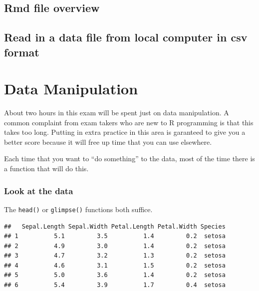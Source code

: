 \documentclass[]{book}
\newenvironment{Shaded}{\begin{snugshade}}{\end{snugshade}}
\newcommand{\KeywordTok}[1]{\textcolor[rgb]{0.13,0.29,0.53}{\textbf{#1}}}
\newcommand{\NormalTok}[1]{#1}
\newcommand{\OperatorTok}[1]{\textcolor[rgb]{0.81,0.36,0.00}{\textbf{#1}}}
\newcommand{\StringTok}[1]{\textcolor[rgb]{0.31,0.60,0.02}{#1}}
\begin{document}
\hypertarget{rmd-file-overview}{%
\section{Rmd file overview}\label{rmd-file-overview}}

\hypertarget{read-in-a-data-file-from-local-computer-in-csv-format}{%
\section{Read in a data file from local computer in csv format}\label{read-in-a-data-file-from-local-computer-in-csv-format}}

\hypertarget{data-manipulation}{%
\chapter{Data Manipulation}\label{data-manipulation}}

About two hours in this exam will be spent just on data manipulation. A common complaint from exam takers who are new to R programming is that this takes too long. Putting in extra practice in this area is garanteed to give you a better score because it will free up time that you can use elsewhere.

Each time that you want to ``do something'' to the data, most of the time there is a function that will do this.

\hypertarget{look-at-the-data}{%
\subsection{Look at the data}\label{look-at-the-data}}

The \texttt{head()} or \texttt{glimpse()} functions both suffice.

\begin{Shaded}
\end{Shaded}

\begin{verbatim}
##   Sepal.Length Sepal.Width Petal.Length Petal.Width Species
## 1          5.1         3.5          1.4         0.2  setosa
## 2          4.9         3.0          1.4         0.2  setosa
## 3          4.7         3.2          1.3         0.2  setosa
## 4          4.6         3.1          1.5         0.2  setosa
## 5          5.0         3.6          1.4         0.2  setosa
## 6          5.4         3.9          1.7         0.4  setosa
\end{verbatim}
\end{document}

